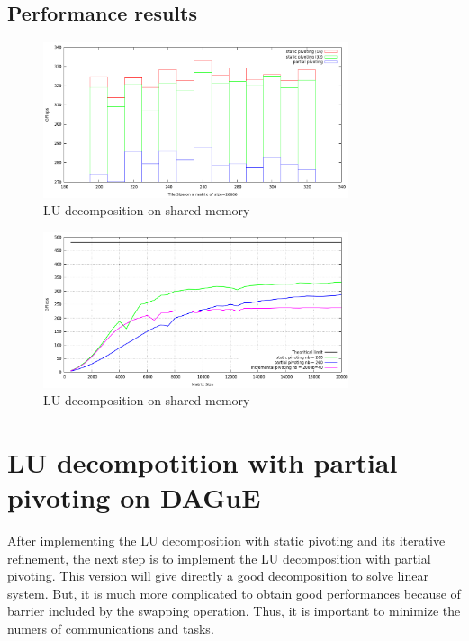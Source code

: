 \documentclass{report}
\begin{document}
\subsection{Performance results}

\begin{figure}[!ht]
\begin{center}
\includegraphics[width=0.8\textwidth]{dgetrf_dague_remus_tile.png} 
\end{center}
\caption{LU decomposition on shared memory}
\end{figure}


\begin{figure}[!ht]
\begin{center}
\includegraphics[width=0.8\textwidth]{dgetrf_dague_remus.png} 
\end{center}
\caption{LU decomposition on shared memory}
\end{figure}

\section{LU decompotition with partial pivoting on DAGuE}
After implementing the LU decomposition with static pivoting and its iterative refinement, the next step is to implement the LU decomposition with partial pivoting. This version will give directly a good decomposition to solve linear system. But, it is much more complicated to obtain good performances because of barrier included by the swapping operation. Thus, it is important to minimize the numers of communications and tasks.
\end{document}
